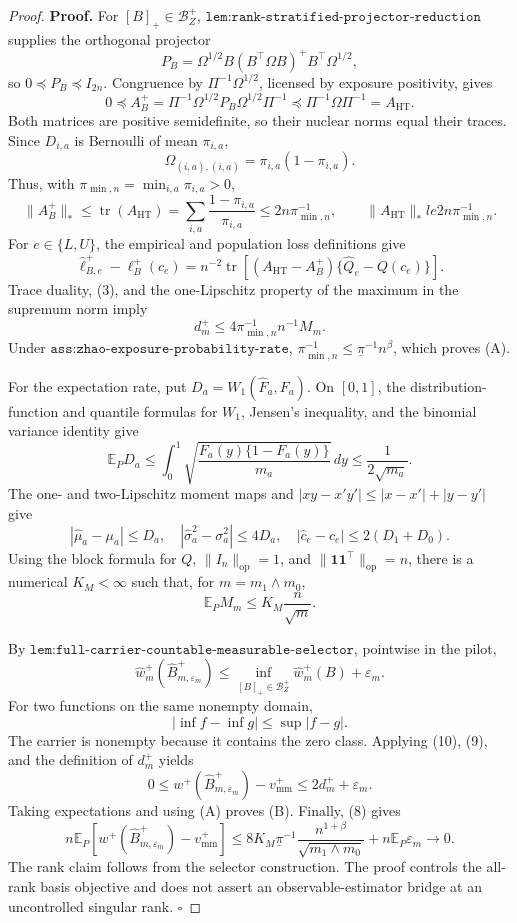 \documentclass{article}
\begin{document}
\begin{proof}
\textbf{Proof.}
For \([B]_+\in\mathcal B_Z^+\), \(\texttt{lem:rank-stratified-projector-reduction}\) supplies the orthogonal projector
\[
P_B=\Omega^{1/2}B(B^{\top}\Omega B)^+B^{\top}\Omega^{1/2},
\]
so \(0\preceq P_B\preceq I_{2n}\).  Congruence by \(\Pi^{-1}\Omega^{1/2}\), licensed by exposure positivity, gives
\[
0\preceq A_B^+
=\Pi^{-1}\Omega^{1/2}P_B\Omega^{1/2}\Pi^{-1}
\preceq \Pi^{-1}\Omega\Pi^{-1}=A_{\mathrm{HT}}.
\tag{1}
\]
Both matrices are positive semidefinite, so their nuclear norms equal their traces.  Since \(D_{i,a}\) is Bernoulli of mean \(\pi_{i,a}\),
\[
\Omega_{(i,a),(i,a)}=\pi_{i,a}(1-\pi_{i,a}).
\tag{2}
\]
Thus, with \(\pi_{\min,n}=\min_{i,a}\pi_{i,a}>0\),
\[
\lVert A_B^+\rVert_*
\le\operatorname{tr}(A_{\mathrm{HT}})
=\sum_{i,a}\frac{1-\pi_{i,a}}{\pi_{i,a}}
\le2n\pi_{\min,n}^{-1},
\qquad
\lVert A_{\mathrm{HT}}\rVert_*le2n\pi_{\min,n}^{-1}.
\tag{3}
\]
For \(e\in\{L,U\}\), the empirical and population loss definitions give
\[
\widehat\ell_{B,e}^+-\ell_B^+(c_e)
=n^{-2}\operatorname{tr}\!\left[(A_{\mathrm{HT}}-A_B^+)
\{\widehat Q_e-Q(c_e)\}\right].
\tag{4}
\]
Trace duality, (3), and the one-Lipschitz property of the maximum in the supremum norm imply
\[
d_m^+\le4\pi_{\min,n}^{-1}n^{-1}M_m.
\tag{5}
\]
Under \(\texttt{ass:zhao-exposure-probability-rate}\), \(\pi_{\min,n}^{-1}\le\underline\pi^{-1}n^\beta\), which proves (A).

For the expectation rate, put \(D_a=W_1(\widehat F_a,F_a)\).  On \([0,1]\), the distribution-function and quantile formulas for \(W_1\), Jensen's inequality, and the binomial variance identity give
\[
\mathbb E_PD_a
\le\int_0^1\sqrt{\frac{F_a(y)\{1-F_a(y)\}}{m_a}}\,dy
\le\frac1{2\sqrt{m_a}}.
\tag{6}
\]
The one- and two-Lipschitz moment maps and
\(|xy-x'y'|\le|x-x'|+|y-y'|\) give
\[
|\widehat\mu_a-\mu_a|\le D_a,
\quad |\widehat\sigma_a^2-\sigma_a^2|\le4D_a,
\quad |\widehat c_e-c_e|\le2(D_1+D_0).
\tag{7}
\]
Using the block formula for \(Q\), \(\lVert I_n\rVert_{\mathrm{op}}=1\), and \(\lVert\mathbf1\mathbf1^{\top}\rVert_{\mathrm{op}}=n\), there is a numerical \(K_M<\infty\) such that, for \(m=m_1\wedge m_0\),
\[
\mathbb E_PM_m\le K_M\frac n{\sqrt m}.
\tag{8}
\]

By \(\texttt{lem:full-carrier-countable-measurable-selector}\), pointwise in the pilot,
\[
\widehat w_m^+(\widehat B_{m,\varepsilon_m}^+)
\le\inf_{[B]_+\in\mathcal B_Z^+}\widehat w_m^+(B)+\varepsilon_m.
\tag{9}
\]
For two functions on the same nonempty domain,
\[
|\inf f-\inf g|\le\sup|f-g|.
\tag{10}
\]
The carrier is nonempty because it contains the zero class.  Applying (10), (9), and the definition of \(d_m^+\) yields
\[
0\le w^+(\widehat B_{m,\varepsilon_m}^+)-v_{\mathrm{mm}}^+
\le2d_m^++\varepsilon_m.
\tag{11}
\]
Taking expectations and using (A) proves (B).  Finally, (8) gives
\[
n\mathbb E_P\!\left[w^+(\widehat B_{m,\varepsilon_m}^+)-v_{\mathrm{mm}}^+\right]
\le8K_M\underline\pi^{-1}\frac{n^{1+\beta}}{\sqrt{m_1\wedge m_0}}
+n\mathbb E_P\varepsilon_m\longrightarrow0.
\tag{12}
\]
The rank claim follows from the selector construction.  The proof controls the all-rank basis objective and does not assert an observable-estimator bridge at an uncontrolled singular rank. \(\square\)
\end{proof}
\end{document}
